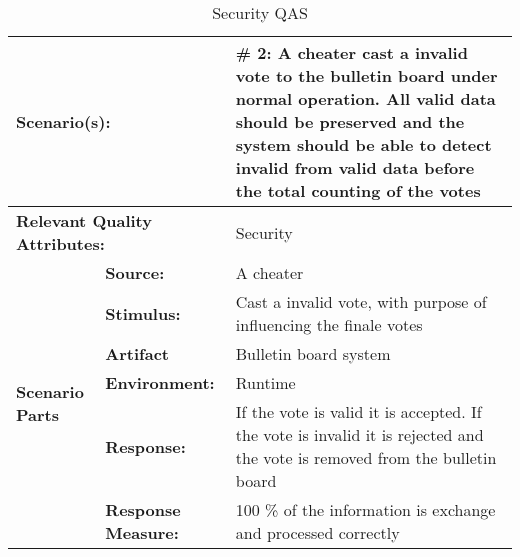 \begin{table}[H]
\begin{center}
\begin{tabular}{|p{0.3cm}|p{2.5cm}|p{8cm}|}
  \hline
  \multicolumn{2}{|p{3cm}|}{\bfseries Scenario(s):} & \#  2: A cheater cast a invalid vote to the bulletin board under normal operation. All valid data should be preserved and the system should be able to detect invalid from  valid data before the total counting of the votes\\
  \hline
  \multicolumn{2}{|p{3cm}|}{\bfseries Relevant Quality Attributes:} & Security\\
  \hline
  \multirow{6}{*}{\begin{sideways}{\bfseries Scenario Parts}\end{sideways}}
  & {\bfseries Source:} & A cheater \\
  \cline{2-3}
  & {\bfseries Stimulus:} & Cast a invalid vote, with purpose of influencing the finale votes \\
  \cline{2-3}
  & {\bfseries Artifact} &  Bulletin board system \\
  \cline{2-3}
  & {\bfseries Environment:} &  Runtime \\
  \cline{2-3}
  & {\bfseries Response:} &  If the vote is valid it is accepted. If the vote is invalid it is rejected and the vote is removed from the bulletin board \\
  \cline{2-3}
  & {\bfseries Response Measure:} & 100 \% of the information is exchange and processed correctly \\
  \hline
\end{tabular}
\caption{Security QAS}
\end{center}
\end{table}


